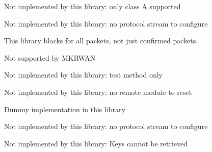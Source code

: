 \begin{DoxyRefList}
%
 Not implemented by this library\+: only class A supported  
\item[Member \mbox{\hyperlink{classSTM32LoRaWAN_a8a580f36418deb428460d6eee12672ba}{S\+T\+M32\+Lo\+Ra\+W\+AN::dumb}} ()]\label{extensions__extensions000039}%
%
 Not implemented by this library\+: no protocol stream to configure  
\item[Member \mbox{\hyperlink{classSTM32LoRaWAN_a816dd9c8b223bda9380971c5a1dab377}{S\+T\+M32\+Lo\+Ra\+W\+AN::end\+Packet}} (bool confirmed=false)]\label{extensions__extensions000008}%
%
 This library blocks for all packets, not just confirmed packets.  
\item[Member \mbox{\hyperlink{classSTM32LoRaWAN_a5b979b128f0cd00d4c7a2dcc549af89a}{S\+T\+M32\+Lo\+Ra\+W\+AN::end\+Packet\+Async}} (bool confirmed=false)]\label{extensions__extensions000018}%
%
 Not supported by M\+K\+R\+W\+AN  
\item[Member \mbox{\hyperlink{classSTM32LoRaWAN_adadf322fc5419467c8612840c006eaaa}{S\+T\+M32\+Lo\+Ra\+W\+AN::en\+Ttone}} ()]\label{extensions__extensions000033}%
%
 Not implemented by this library\+: test method only  
\item[Member \mbox{\hyperlink{classSTM32LoRaWAN_a619ee70f32e4ad240c67af514750ffed}{S\+T\+M32\+Lo\+Ra\+W\+AN::factory\+Default}} ()]\label{extensions__extensions000037}%
%
 Not implemented by this library\+: no remote module to reset  
\item[Member \mbox{\hyperlink{classSTM32LoRaWAN_a730063277eca759fda3c67bc144568a1}{S\+T\+M32\+Lo\+Ra\+W\+AN::flush}} ()]\label{extensions__extensions000009}%
%
 Dummy implementation in this library  
\item[Member \mbox{\hyperlink{classSTM32LoRaWAN_a3eff0f30e2bf1ea1f046c81bcbedecfe}{S\+T\+M32\+Lo\+Ra\+W\+AN::format}} (bool hex\+Mode)]\label{extensions__extensions000038}%
%
 Not implemented by this library\+: no protocol stream to configure  
\item[Member \mbox{\hyperlink{classSTM32LoRaWAN_a0c818ce976451d7ce17f5c4630d109dd}{S\+T\+M32\+Lo\+Ra\+W\+AN::get\+App\+S\+Key}} ()]\label{extensions__extensions000043}%
%
 Not implemented by this library\+: Keys cannot be retrieved  

\end{DoxyRefList}
